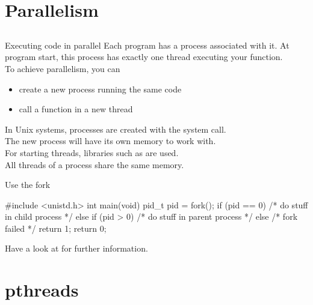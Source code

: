 \documentclass[10pt,graphics,aspectratio=169,table]{beamer}
\begin{document}
\section{Parallelism}
\subsection{}
\begin{frame}{Executing code in parallel}
    Each program has a process associated with it. At program start, this process has
    exactly one thread executing your  function.\\
    \bigskip
    To achieve parallelism, you can
    \begin{itemize}
            \item create a new process running the same code
            \item call a function in a new thread
    \end{itemize}
    \bigskip
    In Unix systems, processes are created with the  system call.\\
    The new process will have its own memory to work with.\\
    For starting threads, libraries such as  are used.\\
    All threads of a process share the same memory.
\end{frame}

\begin{frame}[fragile]{Use the fork}
    \begin{codeblock}
#include <unistd.h>
int main(void) {
    pid_t pid = fork();
    if (pid == 0) {
        /* do stuff in child process */
    } else if (pid > 0) {
        /* do stuff in parent process */
    } else {
        /* fork failed */
        return 1;
    }
    return 0;
}
\end{codeblock}

    Have a look at  for further information.
\end{frame}

\section{pthreads}
\end{document}
